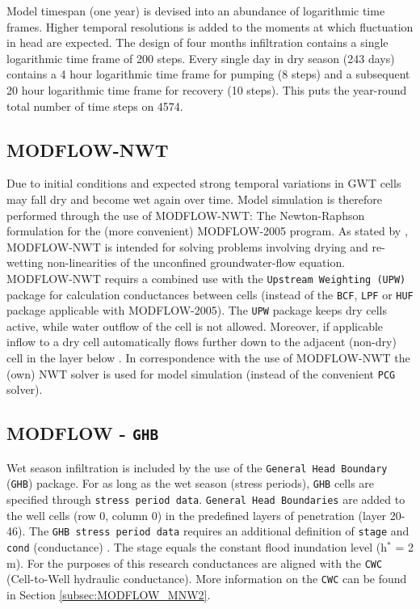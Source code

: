 Model timespan (one year) is devised into an abundance of logarithmic time frames. Higher temporal resolutions is added to the moments at which fluctuation in head are expected. The design of four months infiltration contains a single logarithmic time frame of 200 steps. Every single day in dry season (243 days) contains a 4 hour logarithmic time frame for pumping (8 steps) and a subsequent 20 hour logarithmic time frame for recovery (10 steps). This puts the year-round total number of time steps on 4574. 

\subsection{MODFLOW-NWT} 
Due to initial conditions and expected strong temporal variations in GWT cells may fall dry and become wet again over time. Model simulation is therefore performed through the use of MODFLOW-NWT: The Newton-Raphson formulation for the (more convenient) MODFLOW-2005 program. As stated by \citet{Niswonger2011}, MODFLOW-NWT is intended for solving problems involving drying and re-wetting non-linearities of the unconfined groundwater-flow equation. MODFLOW-NWT requirs a combined use with the \texttt{Upstream Weighting (UPW)} package for calculation conductances between cells (instead of the \texttt{BCF}, \texttt{LPF} or \texttt{HUF} package applicable with MODFLOW-2005). The \texttt{UPW} package keeps dry cells active, while water outflow of the cell is not allowed. Moreover, if applicable inflow to a dry cell automatically flows further down to the adjacent (non-dry) cell in the layer below \citep{Niswonger2011}. In correspondence with the use of MODFLOW-NWT the (own) NWT solver is used for model simulation (instead of the convenient \texttt{PCG} solver). 

\subsection{MODFLOW - \texttt{GHB}}
Wet season infiltration is included by the use of the \texttt{General Head Boundary} (\texttt{GHB}) package. For as long as the wet season (stress periods), \texttt{GHB} cells are specified through \texttt{stress period data}. \texttt{General Head Boundaries} are added to the well cells (row 0, column 0) in the predefined layers of penetration (layer 20-46). The \texttt{GHB stress period data} requires an additional definition of \texttt{stage} and \texttt{cond} (conductance) \citep{Harbaugh2000}. The stage equals the constant flood inundation level (h$^*$ = 2 m). For the purposes of this research conductances are aligned with the \texttt{CWC} (Cell-to-Well hydraulic conductance). More information on the \texttt{CWC} can be found in Section \ref{subsec:MODFLOW_MNW2}. 

